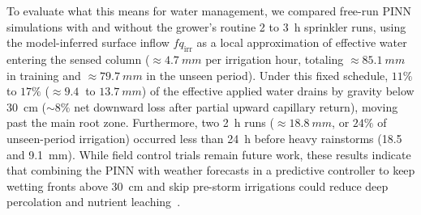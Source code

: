 \documentclass[pdflatex,sn-nature]{sn-jnl}%
\theoremstyle{thmstyleone}%
\theoremstyle{thmstyletwo}%
\theoremstyle{thmstylethree}%
\begin{document}
{To evaluate what this means for water management, we compared free-run PINN simulations with and without the grower's routine 2 to 3~\si{h} sprinkler runs, using the model-inferred surface inflow $fq_{\mathrm{irr}}$ as a local approximation of effective water entering the sensed column ($\approx\SI{4.7}{mm}$ per irrigation hour, totaling $\approx\SI{85.1}{mm}$ in training and $\approx\SI{79.7}{mm}$ in the unseen period). Under this fixed schedule, $11\%$ to $17\%$ ($\approx\SI{9.4}{}$ to $\SI{13.7}{mm}$) of the effective applied water drains by gravity below 30~\si{cm} ($\sim 8\%$ net downward loss after partial upward capillary return), moving past the main root zone. Furthermore, two 2~\si{h} runs ($\approx\SI{18.8}{mm}$, or $24\%$ of unseen-period irrigation) occurred less than 24~\si{h} before heavy rainstorms (18.5 and \SI{9.1}{mm}). While field control trials remain future work, these results indicate that combining the PINN with weather forecasts in a predictive controller to keep wetting fronts above 30~\si{cm} and skip pre-storm irrigations could reduce deep percolation and nutrient leaching~\cite{Morgan2006, Obreza2010}.}
\end{document}
